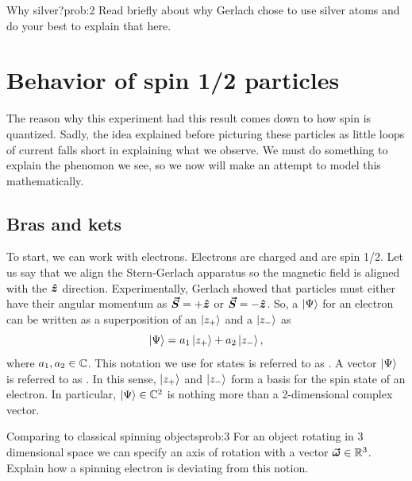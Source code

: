 \documentclass{article}
\newcommand{\vecS}{\boldsymbol{\vec{S}}}
\begin{document}
\begin{problem}{Why silver?}{prob:2}
    Read briefly about why Gerlach chose to use silver atoms and do your best to explain that here.
\end{problem}


\section{Behavior of spin 1/2 particles}

The reason why this experiment had this result comes down to how spin is quantized. Sadly, the idea explained before picturing these particles as little loops of current falls short in explaining what we observe. We must do something to explain the phenomon we see, so we now will make an attempt to model this mathematically.

\subsection{Bras and kets}
To start, we can work with electrons. Electrons are charged and are spin 1/2.  Let us say that we align the Stern-Gerlach apparatus so the magnetic field is aligned with the $\boldsymbol{\hat{z}}$ direction.  Experimentally, Gerlach showed that particles must either have their angular momentum as $\vecS= + \zhat$ or $\vecS=-\zhat$. So, a  $\ket{\Psi}$ for an electron can be written as a superposition of an  $\ket{z_+}$ and a  $\ket{z_-}$ as
\[
\ket{\Psi} = a_1 \ket{z_+} + a_2 \ket{z_-},
\]
where $a_1,a_2 \in \mathbb{C}$. This notation we use for states is referred to as . A vector $\ket{\Psi}$ is referred to as . In this sense, $\ket{z_+}$ and $\ket{z_-}$ form a basis for the spin state of an electron. In particular, $\ket{\Psi} \in \mathbb{C}^2$ is nothing more than a 2-dimensional complex vector. 

\begin{problem}{Comparing to classical spinning objects}{prob:3}
    For an object rotating in 3 dimensional space we can specify an axis of rotation with a vector $\boldsymbol{\vec{\omega}}\in \mathbb{R}^3$. Explain how a spinning electron is deviating from this notion.
\end{problem}
\end{document}
